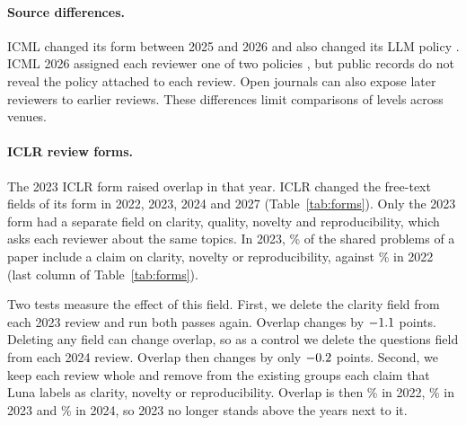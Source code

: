 \documentclass[11pt]{article}
\begin{document}
\begin{table}[!htp]
\centering\footnotesize

\caption{Each conference year and each journal source in two periods. Overlap is the mean over papers with its SE. Flagged: share of reviews that each detector flags at its own threshold (Appendix~\ref{app:ai}).}
\label{tab:byyear}
\end{table}


\paragraph{Source differences.}
ICML changed its form between 2025 and 2026 and also changed its LLM policy \citep{icml2025reviewers,icml2026llm,icml2026reviewers}. ICML 2026 assigned each reviewer one of two policies \citep{kim2026icmltrial}, but public records do not reveal the policy attached to each review. Open journals can also expose later reviewers to earlier reviews. These differences limit comparisons of levels across venues.

\paragraph{ICLR review forms.}
\label{app:forms}
The 2023 ICLR form raised overlap in that year. ICLR changed the free-text fields of its form in 2022, 2023, 2024 and 2027 (Table~\ref{tab:forms}). Only the 2023 form had a separate field on clarity, quality, novelty and reproducibility, which asks each reviewer about the same topics. In 2023, \FormSharedBase\% of the shared problems of a paper include a claim on clarity, novelty or reproducibility, against \FormSharedPrev\% in 2022 (last column of Table~\ref{tab:forms}).

Two tests measure the effect of this field. First, we delete the clarity field from each 2023 review and run both passes again. Overlap changes by $-1.1$ points. Deleting any field can change overlap, so as a control we delete the questions field from each 2024 review. Overlap then changes by only $-0.2$ points. Second, we keep each review whole and remove from the existing groups each claim that Luna labels as clarity, novelty or reproducibility. Overlap is then \FormWithoutPrev\% in 2022, \FormWithoutBase\% in 2023 and \FormWithoutNext\% in 2024, so 2023 no longer stands above the years next to it.

\begin{table}[!htp]
\centering\small

\caption{Only the 2023 ICLR form had a separate field on clarity, quality, novelty and reproducibility (bold). Field deleted: we delete the clarity field in 2023 and, as a control, the questions field in 2024, and run both passes again. Categories dropped: we remove the claims on clarity, novelty and reproducibility from the existing groups. Shared problems in categories: share of the shared problems of a paper that include at least one claim on clarity, novelty or reproducibility. All values are means over papers.}
\label{tab:forms}
\end{table}
\end{document}
